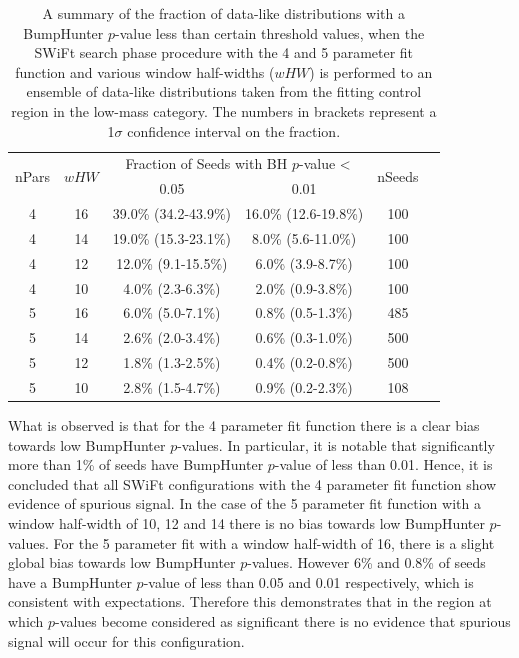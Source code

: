 \begin{table}[!ht]
\centering
\begin{tabular}{|c|c||c|c|c|c|}
  \hline
\multirow{2}{*}{nPars} & \multirow{2}{*}{$wHW$} &\multicolumn{2}{c|}{Fraction of Seeds with BH \mbox{$p$-value} \textless} &  \multirow{2}{*}{nSeeds} \\ \cline{3-4} 
                       &                     & 0.05                & 0.01            &        \\ 
  \hline
  4 &   16&  39.0\% (34.2-43.9\%) & 16.0\% (12.6-19.8\%) &  100  \\
  4 &   14&  19.0\% (15.3-23.1\%) &  8.0\% (5.6-11.0\%)  &  100  \\
  4 &   12&  12.0\% (9.1-15.5\%)  &  6.0\% (3.9-8.7\%)   &  100  \\
  4 &   10&  4.0\% (2.3-6.3\%)    &  2.0\% (0.9-3.8\%)   &  100  \\
  \hline
  5 &   16&   6.0\% (5.0-7.1\%)  &  0.8\% (0.5-1.3\%)   &  485  \\
  5 &   14&   2.6\% (2.0-3.4\%)  &  0.6\% (0.3-1.0\%)   &  500  \\
  5 &   12&   1.8\% (1.3-2.5\%)  &  0.4\% (0.2-0.8\%)    &  500  \\
  5 &   10&   2.8\% (1.5-4.7\%)  &  0.9\% (0.2-2.3\%)    &  108  \\
  \hline
\end{tabular}
\vspace{10pt}
\caption{\label{tab:bumpH_lm_spuriousSignal}
  A summary of the fraction of data-like distributions 
  with a {\sc BumpHunter} \mbox{$p$-value} less than certain threshold values,
  when the SWiFt search phase procedure with the 4 and 5 parameter fit function
  and various window half-widths ($wHW$) is performed to an ensemble of data-like distributions
  taken from the fitting control region in the low-mass category.
  The numbers in brackets represent a 1$\sigma$ confidence interval on the fraction.}
\end{table}


What is observed is that for the 4 parameter fit function  there is a clear bias towards
low {\sc BumpHunter} \mbox{$p$-value}s.
In particular, it is notable that significantly more than 1\% of seeds have {\sc BumpHunter} \mbox{$p$-value} of less than 0.01.
Hence, it is concluded that all SWiFt configurations with the 4 parameter fit function show evidence of spurious signal.
In the case of the 5 parameter fit function
with a window half-width of 10, 12 and 14 there is no bias towards low {\sc BumpHunter} \mbox{$p$-value}s.
For the 5 parameter fit with a window half-width of 16, there is a slight global bias towards low {\sc BumpHunter} \mbox{$p$-value}s.
However 6\% and 0.8\% of seeds have a {\sc BumpHunter} \mbox{$p$-value} of less than 0.05 and 0.01 respectively, which is consistent with expectations.
Therefore this demonstrates that in the region at which \mbox{$p$-value}s become considered as significant there is no evidence that spurious signal will occur for this configuration.

